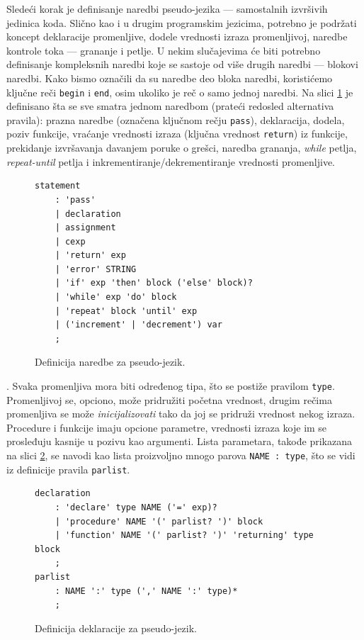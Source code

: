Sledeći korak je definisanje naredbi pseudo-jezika --- samostalnih izvršivih jedinica koda. Slično kao i u drugim programskim jezicima, potrebno je podržati koncept deklaracije promenljive, dodele vrednosti izraza promenljivoj, naredbe kontrole toka --- grananje i petlje. U nekim slučajevima će biti potrebno definisanje kompleksnih naredbi koje se sastoje od više drugih naredbi --- blokovi naredbi. Kako bismo označili da su naredbe deo bloka naredbi, koristićemo ključne reči \texttt{begin} i \texttt{end}, osim ukoliko je reč o samo jednoj naredbi. Na slici \ref{fig:PseudoDef2} je definisano šta se sve smatra jednom naredbom (prateći redosled alternativa pravila): prazna naredbe (označena ključnom rečju \texttt{pass}), deklaracija, dodela, poziv funkcije, vraćanje vrednosti izraza (ključna vrednost \texttt{return}) iz funkcije, prekidanje izvršavanja davanjem poruke o grešci, naredba grananja, \emph{while} petlja, \emph{repeat-until} petlja i inkrementiranje/dekrementiranje vrednosti promenljive. 
    
\begin{figure}[h!]
\begin{lstlisting}[language={}]
statement
    : 'pass'
    | declaration
    | assignment
    | cexp
    | 'return' exp
    | 'error' STRING
    | 'if' exp 'then' block ('else' block)? 
    | 'while' exp 'do' block 
    | 'repeat' block 'until' exp
    | ('increment' | 'decrement') var	
    ;
\end{lstlisting}
\caption{Definicija naredbe za pseudo-jezik.}
\label{fig:PseudoDef2}
\end{figure}

    . Svaka promenljiva mora biti određenog tipa, što se postiže pravilom \texttt{type}. Promenljivoj se, opciono, može pridružiti početna vrednost, drugim rečima promenljiva se može \emph{inicijalizovati} tako da joj se pridruži vrednost nekog izraza. Procedure i funkcije imaju opcione parametre, vrednosti izraza koje im se prosleđuju kasnije u pozivu kao argumenti. Lista parametara, takođe prikazana na slici \ref{fig:PseudoDef3}, se navodi kao lista proizvoljno mnogo parova \texttt{NAME : type}, što se vidi iz definicije pravila \texttt{parlist}.

\begin{figure}[h!]
\begin{lstlisting}[language={}]
declaration
    : 'declare' type NAME ('=' exp)? 
    | 'procedure' NAME '(' parlist? ')' block 
    | 'function' NAME '(' parlist? ')' 'returning' type block 
    ;
parlist
    : NAME ':' type (',' NAME ':' type)*
    ;
\end{lstlisting}
\caption{Definicija deklaracije za pseudo-jezik.}
\label{fig:PseudoDef3}
\end{figure}


